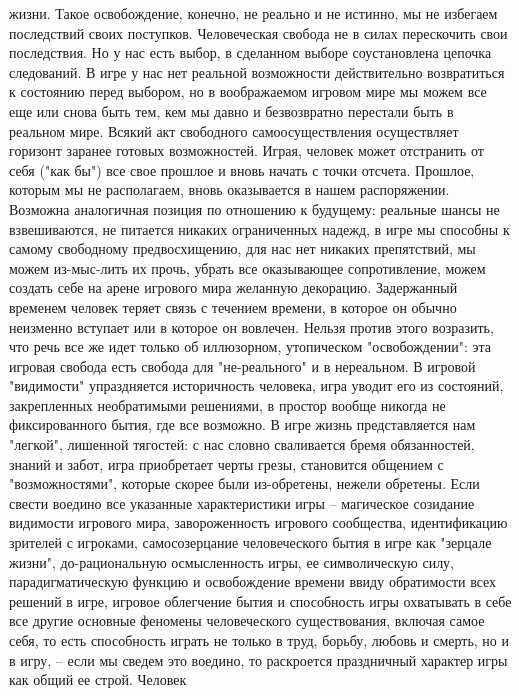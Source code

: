 \documentclass[12pt]{article}
\begin{document}
жизни. Такое освобождение, конечно, не реально и не истинно, мы не избегаем последствий своих поступков.
Человеческая свобода не в силах перескочить свои последствия. Но у нас есть выбор, в сделанном выборе
соустановлена цепочка следований. В игре у нас нет реальной возможности действительно возвратиться к
состоянию перед выбором, но в воображаемом игровом мире мы можем все еще или снова быть тем, кем мы
давно  и  безвозвратно  перестали  быть  в  реальном  мире.  Всякий  акт  свободного  самоосуществления
осуществляет горизонт заранее готовых возможностей. Играя, человек может отстранить от себя ("как бы") все
свое прошлое и вновь начать с точки отсчета. Прошлое, которым мы не располагаем, вновь оказывается в 
нашем  распоряжении.  Возможна  аналогичная  позиция  по  отношению  к  будущему:  реальные  шансы  не
взвешиваются,  не  питается  никаких  ограниченных  надежд,  в  игре  мы  способны  к  самому  свободному
предвосхищению, для нас нет никаких препятствий, мы можем из-мыс-лить их прочь, убрать все оказывающее
сопротивление, можем создать себе на арене игрового мира желанную декорацию. Задержанный временем
человек теряет связь с течением времени, в которое он обычно неизменно вступает или в которое он вовлечен.
Нельзя против этого возразить, что речь все же идет только об иллюзорном, утопическом "освобождении": эта
игровая  свобода  есть  свобода  для  "не-реального"  и  в  нереальном.  В  игровой  "видимости"  упраздняется
историчность человека, игра уводит его из состояний, закрепленных необратимыми решениями, в простор
вообще никогда не  фиксированного бытия, где  все возможно. В игре жизнь представляется нам "легкой",
лишенной тягостей: с нас словно сваливается бремя обязанностей, знаний и забот, игра приобретает черты
грезы, становится общением с "возможностями", которые скорее были из-обретены, нежели обретены. Если
свести  воедино  все  указанные  характеристики  игры  --  магическое  созидание  видимости  игрового  мира,
завороженность  игрового сообщества,  идентификацию  зрителей  с игроками,  самосозерцание человеческого
бытия  в  игре  как  "зерцале  жизни",  до-рациональную  осмысленность  игры,  ее  символическую  силу,
парадигматическую  функцию  и  освобождение  времени  ввиду  обратимости  всех  решений  в  игре,  игровое
облегчение  бытия  и  способность  игры  охватывать  в  себе  все  другие  основные  феномены  человеческого
существования, включая самое себя, то есть способность играть не только в труд, борьбу, любовь и смерть, но и
в игру, -- если мы сведем это воедино, то раскроется праздничный характер игры как общий ее строй. Человек
\end{document}
